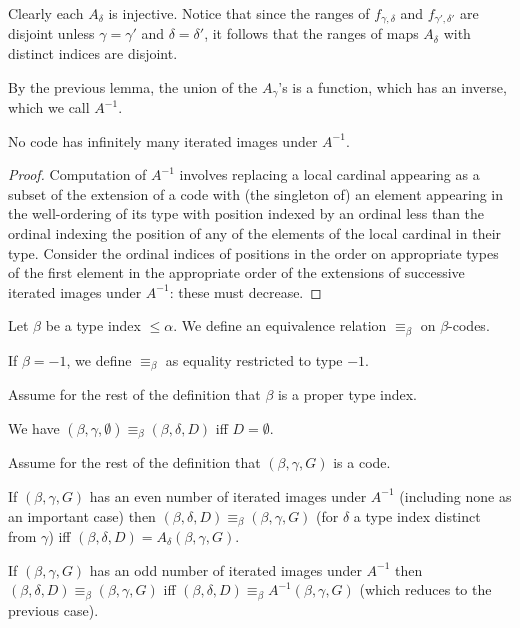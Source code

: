 \begin{lemma}
\label {lem:alt-ext-nature}   
Clearly each $A_\delta$ is injective.  Notice that since the ranges of $f_{\gamma,\delta}$ and $f_{\gamma',\delta'}$ are disjoint unless $\gamma=\gamma'$ and $\delta=\delta'$, it follows that the ranges of
maps $A_\delta$ with distinct indices are disjoint.
\end{lemma}

\begin{definition}
\label {def:ainverse}    
By the previous lemma, the union of the $A_\gamma$'s is a function, which has an inverse, which we call $A^{-1}$.
\end{definition}

\begin{lemma}
\label {lem:ainverse-stops}   
No code has infinitely many iterated images under $A^{-1}$.
\end{lemma}

\begin{proof}
Computation of $A^{-1}$ involves replacing a local cardinal appearing as a subset of the extension of a code
with (the singleton of) an element appearing in the well-ordering of its type with position indexed by an ordinal
less than the ordinal indexing the position of any of the elements of the local cardinal in their type.  Consider the ordinal indices of positions in the order on appropriate types of the first element in the appropriate order of the extensions of successive iterated images under $A^{-1}$:  these must decrease.
\end{proof}

\begin{definition}
\label {def:equiv-code}    
Let $\beta$ be a type index $\leq \alpha$.  We define an equivalence relation $\equiv_\beta$ on $\beta$-codes.

If $\beta=-1$, we define $\equiv_\beta$ as equality restricted to type $-1$.

Assume for the rest of the definition that $\beta$ is a proper type index.

We have $(\beta,\gamma,\emptyset) \equiv_\beta (\beta,\delta,D)$ iff $D=\emptyset$.

Assume for the rest of the definition that $(\beta,\gamma,G)$ is a code.

If $(\beta,\gamma,G)$ has an even number of iterated images under $A^{-1}$ (including none as an important case)
then $(\beta,\delta,D) \equiv_\beta (\beta,\gamma,G)$ (for $\delta$ a type index distinct from $\gamma$) iff
$(\beta,\delta,D) = A_{\delta}(\beta,\gamma,G)$.

If $(\beta,\gamma,G)$ has an odd number of iterated images under $A^{-1}$ then $(\beta,\delta,D) \equiv_\beta (\beta,\gamma,G)$ iff $(\beta,\delta,D) \equiv_\beta A^{-1}(\beta,\gamma,G)$ (which reduces to the previous case).
\end{definition}


